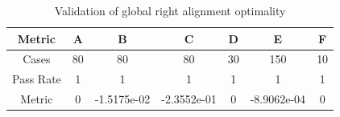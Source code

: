 \begin{table}[t]
\centering
\begin{tabular}{ccccccc}
\toprule
Metric & A & B & C & D & E & F \\
\midrule
Cases & 80 & 80 & 80 & 30 & 150 & 10 \\
Pass Rate & 1 & 1 & 1 & 1 & 1 & 1 \\
Metric & 0 & -1.5175e-02 & -2.3552e-01 & 0 & -8.9062e-04 & 0 \\
\bottomrule
\end{tabular}
\caption{Validation of global right alignment optimality}
\label{tab:alignment_validation}
\end{table}
